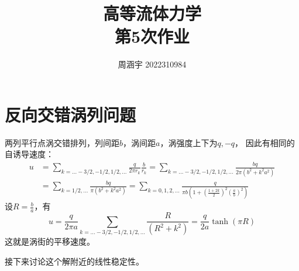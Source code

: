 \documentclass[UTF8,zihao=5]{ctexart} %
\title{{\bfseries\rmfamily\Huge{高等流体力学\hspace{1em}\\第5次作业}}}
\author{周涵宇 2022310984}
\date{}
\begin{document}
\maketitle
\thispagestyle{fancy}


\section{反向交错涡列问题}

两列平行点涡交错排列，列间距$b$，涡间距$a$，涡强度上下为$q,-q$，
因此有相同的自诱导速度：
$$
    \begin{aligned}
        u & = \sum_{k=\dots-3/2,-1/2,1/2,\dots}{
            \frac{q}{2\pi r_k} \frac{b}{r_k}
        }
        =
        \sum_{k=\dots-3/2,-1/2,1/2,\dots}{
            \frac{bq}{2\pi (b^2 + k^2a^2)}
        }                                        \\
          & =
        \sum_{k=1/2,\dots}{
            \frac{bq}{\pi (b^2 + k^2a^2)}
        }
        =
        \sum_{k=0,1,2,...}{
            \frac{q}{\pi b \left(
                1 + (\frac{1+2k}{2})^2(\frac{a}{b})^2
                \right)}
        }
    \end{aligned}
$$
设$R = \frac{b}{a}$，有
$$
    u = \frac{q}{2\pi a}
    \sum_{k=\dots-3/2,-1/2,1/2,\dots}{
        \frac{R}{(R^2 + k^2)}
    }
    =
    \frac{q}{2a} \tanh (\pi R)
$$
这就是涡街的平移速度。

接下来讨论这个解附近的线性稳定性。


\end{document}
